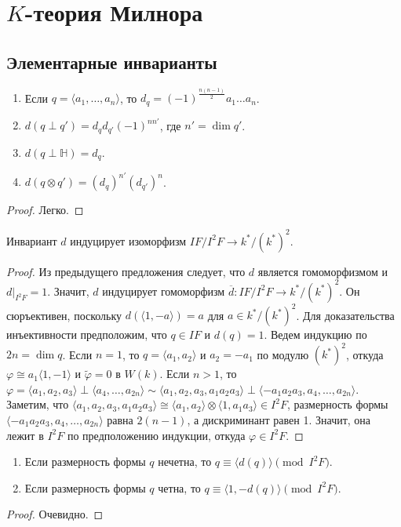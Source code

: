 \documentclass[a4paper,oneside,12pt]{article}
\theoremstyle{plain} { \swapnumbers
\newtheorem{theorem}{Теорема}[subsection]
\newtheorem{corollary}[theorem]{Следствие}
\newtheorem{lemma}[theorem]{Лемма}
\newtheorem{proposition}[theorem]{Утверждение}
\newtheorem{claim}[theorem]{Факт}
}
\theoremstyle{definition} { \swapnumbers
\newtheorem{definition}[theorem]{Определение}
\newtheorem{notation}[theorem]{Обозначение}
\newtheorem{remark}[theorem]{Замечание}
\newtheorem{remarks}[theorem]{Замечания}
\newtheorem{example}[theorem]{Пример}
\newtheorem{examples}[theorem]{Примеры}
\newtheorem{sssection}[theorem]{}
}
\def\tilde{\widetilde}
\def\ph{\varphi}
\def\la{\langle}
\def\ra{\rangle}
\begin{document}
\section{$K$-теория Милнора}


\subsection{Элементарные инварианты}

\begin{proposition}\label{prop:disc_properties}
\begin{enumerate}
\item Если $q=\la a_1,\dots,a_n\ra$, то $d_q=(-1)^{\frac{n(n-1)}{2}}a_1\dots a_n$.
\item $d(q\perp q')=d_qd_{q'}(-1)^{nn'}$, где $n'=\dim q'$.
\item $d(q\perp\mathbb H)=d_q$.
\item $d(q\otimes q')=(d_q)^{n'}(d_{q'})^n$.
\end{enumerate}
\end{proposition}
\begin{proof}
Легко.
\end{proof}

\begin{theorem}\label{thm:discriminant_iso}
Инвариант $d$ индуцирует изоморфизм $IF/I^2F\to k^*/(k^*)^2$.
\end{theorem}
\begin{proof}
Из предыдущего предложения следует, что $d$ является гомоморфизмом
и $d|_{I^2F}=1$. Значит, $d$ индуцирует гомоморфизм
$\overline{d}\colon IF/I^2F\to k^*/(k^*)^2$. Он сюръективен,
поскольку $d(\la 1,-a\ra)=a$ для $a\in k^*/(k^*)^2$. Для доказательства
инъективности предположим, что $q\in IF$ и $d(q)=1$. Ведем индукцию
по $2n=\dim q$. Если $n=1$, то $q=\la a_1,a_2\ra$ и $a_2=-a_1$ по модулю $(k^*)^2$,
откуда $\ph\cong a_1\la 1,-1\ra$ и $\tilde\ph=0$ в $W(k)$. Если $n>1$, то
$\ph=\la a_1,a_2,a_3\ra\perp\la a_4,\dots,a_{2n}\ra\sim\la a_1,a_2,a_3,a_1a_2a_3\ra\perp
\la -a_1a_2a_3,a_4,\dots,a_{2n}\ra$. Заметим, что $\la a_1,a_2,a_3,a_1a_2a_3\ra\cong
\la a_1,a_2\ra\otimes\la 1,a_1a_3\ra\in I^2F$, размерность формы
$\la -a_1a_2a_3,a_4,\dots,a_{2n}\ra$ равна $2(n-1)$, а дискриминант равен 1.
Значит, она лежит в $I^2F$ по предположению индукции, откуда $\ph\in I^2F$.
\end{proof}

\begin{corollary}
\begin{enumerate}
\item Если размерность формы $q$ нечетна, то $q\equiv\la d(q)\ra\pmod{I^2F}$.
\item Если размерность формы $q$ четна, то $q\equiv\la 1,-d(q)\ra\pmod{I^2F}$.
\end{enumerate}
\end{corollary}
\begin{proof}
Очевидно.
\end{proof}
\end{document}
